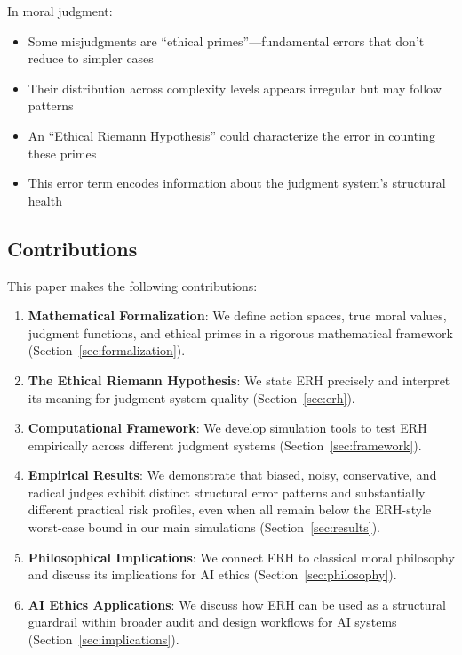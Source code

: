 \documentclass[12pt,a4paper]{article}
\theoremstyle{definition}
\theoremstyle{remark}
\begin{document}
In moral judgment:
\begin{itemize}
    \item Some misjudgments are ``ethical primes''---fundamental errors that don't reduce to simpler cases
    \item Their distribution across complexity levels appears irregular but may follow patterns
    \item An ``Ethical Riemann Hypothesis'' could characterize the error in counting these primes
    \item This error term encodes information about the judgment system's structural health
\end{itemize}

\subsection{Contributions}

This paper makes the following contributions:

\begin{enumerate}
    \item \textbf{Mathematical Formalization}: We define action spaces, true moral values, judgment functions, and ethical primes in a rigorous mathematical framework (Section~\ref{sec:formalization}).
    
    \item \textbf{The Ethical Riemann Hypothesis}: We state ERH precisely and interpret its meaning for judgment system quality (Section~\ref{sec:erh}).
    
    \item \textbf{Computational Framework}: We develop simulation tools to test ERH empirically across different judgment systems (Section~\ref{sec:framework}).
    
    \item \textbf{Empirical Results}: We demonstrate that biased, noisy, conservative, and radical judges exhibit distinct structural error patterns and substantially different practical risk profiles, even when all remain below the ERH-style worst-case bound in our main simulations (Section~\ref{sec:results}).
    
    \item \textbf{Philosophical Implications}: We connect ERH to classical moral philosophy and discuss its implications for AI ethics (Section~\ref{sec:philosophy}).
    
    \item \textbf{AI Ethics Applications}: We discuss how ERH can be used as a structural guardrail within broader audit and design workflows for AI systems (Section~\ref{sec:implications}).
\end{enumerate}
\end{document}
